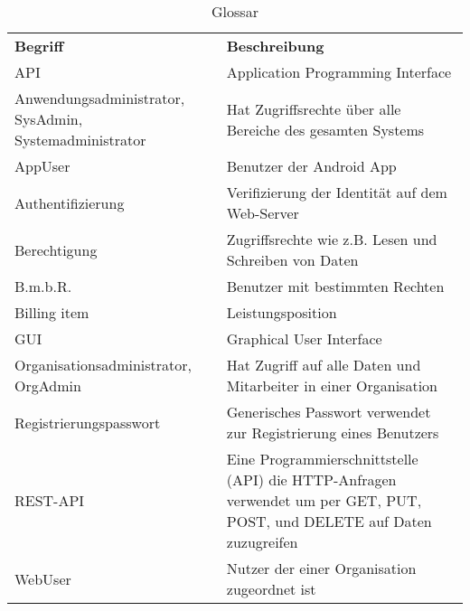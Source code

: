 
\begin{table}[h]
	\centering
	\begin{tabularx}{\textwidth}{X X}
		\rowcolor[HTML]{C0C0C0} 
		\textbf{Begriff} & \textbf{Beschreibung} \\
		
		API & Application Programming Interface\\

		\rowcolor[HTML]{E7E7E7} 
		Anwendungsadministrator, SysAdmin, Systemadministrator  & Hat Zugriffsrechte über alle Bereiche des gesamten Systems \\
		
		AppUser & Benutzer der Android App \\

		\rowcolor[HTML]{E7E7E7} 		
		Authentifizierung & Verifizierung der Identität auf dem Web-Server \\
		
		Berechtigung & Zugriffsrechte wie z.B. Lesen und Schreiben von Daten \\
		
		\rowcolor[HTML]{E7E7E7} 
		B.m.b.R. & Benutzer mit bestimmten Rechten \\
		
		Billing item & Leistungsposition \\
		
		\rowcolor[HTML]{E7E7E7} 
		GUI & Graphical User Interface \\
		
		Organisationsadministrator, OrgAdmin & Hat Zugriff auf alle Daten und Mitarbeiter in einer Organisation \\
		
		\rowcolor[HTML]{E7E7E7} 
		Registrierungspasswort & Generisches Passwort verwendet zur Registrierung eines Benutzers \\
		
		REST-API & Eine Programmierschnittstelle (API) die HTTP-Anfragen verwendet um per GET, PUT, POST, und DELETE auf Daten zuzugreifen \\

		\rowcolor[HTML]{E7E7E7} 
		WebUser & Nutzer der einer Organisation zugeordnet ist \\
		
	\end{tabularx}
	\caption{Glossar}
	\label{table:glossar}
\end{table}